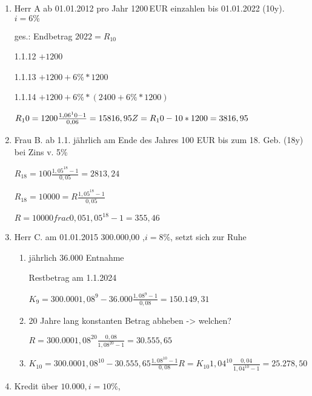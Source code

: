 \documentclass[12pt,a4paper]{scrreprt}
\begin{document}
\begin{enumerate}
\item

Herr A ab 01.01.2012 pro Jahr 1200\,EUR einzahlen bis 01.01.2022 (10y).
$i = 6\%$

ges.: Endbetrag $2022 = R_10$


1.1.12 $+1200$

1.1.13 $+1200 + 6\%*1200$

1.1.14 $+1200 + 6\%*(2400 + 6\%*1200)$

$
R_10 = 1200 \frac{1,06^10-1}{0,06} = 15816,95 \\
Z = R_10 - 10*1200 = 3816,95
$

\item

Frau B. ab 1.1. jährlich am Ende des Jahres
100 EUR bis zum 18. Geb. (18y) bei Zins v. 5\%

$R_18 = 100 \frac{1,05^18-1}{0,05} = 2813,24$

$R_18 = 10000 = R \frac{1,05^18-1}{0,05}$

$R = 10000 frac{0,05}{1,05^18-1} = 355,46$

\item

Herr C. am 01.01.2015 300.000,00 ,$ i=8\% $, setzt sich zur Ruhe

\begin{enumerate}

\item jährlich 36.000 Entnahme

Restbetrag am 1.1.2024

$K_9 = 300.000 1,08^9 - 36.000 \frac{1,08^9 - 1}{0,08} = 150.149,31$

\item

20 Jahre lang konstanten Betrag abheben -> welchen?

$R = 300.000 1,08^20 \frac{0,08}{1,08^20 - 1} = 30.555,65$

\item

$
K_10 = 300.000 1,08^10 - 30.555,65 \frac{1,08^10 - 1}{0,08} %
R = K_10 1,04^10 \frac{0,04}{1,04^10 - 1} = 25.278,50
$

\end{enumerate}

\item

Kredit über $10.000, i=10\%$, 


\end{enumerate}
\end{document}
